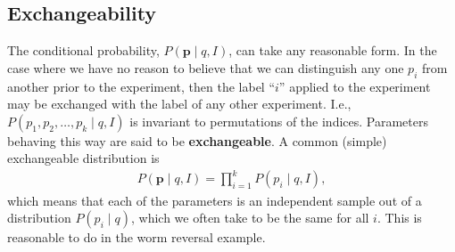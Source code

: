 \subsection{Exchangeability}
The conditional probability, $P(\mathbf{p}\mid q, I)$, can take any
reasonable form.  In the case where we have no reason to believe that
we can distinguish any one $p_i$ from another prior to the experiment,
then the label ``$i$'' applied to the experiment may be exchanged with
the label of any other experiment.  I.e.,
$P(p_1, p_2, \ldots, p_k \mid q, I)$ is invariant to permutations of
the indices.  Parameters behaving this way are said to be
\textbf{exchangeable}.  A common (simple) exchangeable distribution is
\begin{align}
P(\mathbf{p}\mid q, I) = \prod_{i=1}^k P(p_i\mid q, I),
\end{align}
which means that each of the parameters is an independent sample out
of a distribution $P(p_i\mid q)$, which we often take to be the same
for all $i$.  This is reasonable to do in the worm reversal example.


